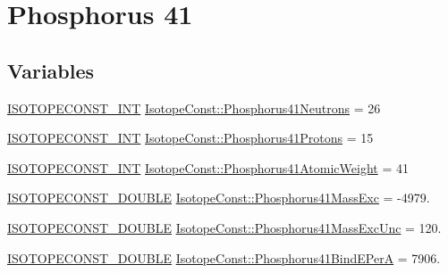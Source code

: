 \hypertarget{group___isotope_const-_phosphorus-_p41}{}\section{Phosphorus 41}
\label{group___isotope_const-_phosphorus-_p41}
\subsection*{Variables}
\begin{DoxyCompactItemize}
\item 
\mbox{\hyperlink{group___isotope_const-_macros_ga5f18360b3e99483a35c32d789e62621c}{I\+S\+O\+T\+O\+P\+E\+C\+O\+N\+S\+T\+\_\+\+I\+NT}} \mbox{\hyperlink{group___isotope_const-_phosphorus-_p41_ga99e25b1f96d95776a1eab9b57edd54c6}{Isotope\+Const\+::\+Phosphorus41\+Neutrons}} = 26
\item 
\mbox{\hyperlink{group___isotope_const-_macros_ga5f18360b3e99483a35c32d789e62621c}{I\+S\+O\+T\+O\+P\+E\+C\+O\+N\+S\+T\+\_\+\+I\+NT}} \mbox{\hyperlink{group___isotope_const-_phosphorus-_p41_ga430434d0ead0741b56f403a51beacf0a}{Isotope\+Const\+::\+Phosphorus41\+Protons}} = 15
\item 
\mbox{\hyperlink{group___isotope_const-_macros_ga5f18360b3e99483a35c32d789e62621c}{I\+S\+O\+T\+O\+P\+E\+C\+O\+N\+S\+T\+\_\+\+I\+NT}} \mbox{\hyperlink{group___isotope_const-_phosphorus-_p41_gafa71071d0de18d2521ffdafe0281068a}{Isotope\+Const\+::\+Phosphorus41\+Atomic\+Weight}} = 41
\item 
\mbox{\hyperlink{group___isotope_const-_macros_ga8f45a7272ce02c0b4c65c44636ed719a}{I\+S\+O\+T\+O\+P\+E\+C\+O\+N\+S\+T\+\_\+\+D\+O\+U\+B\+LE}} \mbox{\hyperlink{group___isotope_const-_phosphorus-_p41_gac799367ed7f92d6c20c0af51537fe917}{Isotope\+Const\+::\+Phosphorus41\+Mass\+Exc}} = -\/4979.
\item 
\mbox{\hyperlink{group___isotope_const-_macros_ga8f45a7272ce02c0b4c65c44636ed719a}{I\+S\+O\+T\+O\+P\+E\+C\+O\+N\+S\+T\+\_\+\+D\+O\+U\+B\+LE}} \mbox{\hyperlink{group___isotope_const-_phosphorus-_p41_gaffcecf6a4cbb35364c0e909872a55366}{Isotope\+Const\+::\+Phosphorus41\+Mass\+Exc\+Unc}} = 120.
\item 
\mbox{\hyperlink{group___isotope_const-_macros_ga8f45a7272ce02c0b4c65c44636ed719a}{I\+S\+O\+T\+O\+P\+E\+C\+O\+N\+S\+T\+\_\+\+D\+O\+U\+B\+LE}} \mbox{\hyperlink{group___isotope_const-_phosphorus-_p41_ga32df729881916fb2bc3a55d65d9bf47d}{Isotope\+Const\+::\+Phosphorus41\+Bind\+E\+PerA}} = 7906.
\item 

\end{DoxyCompactItemize}
